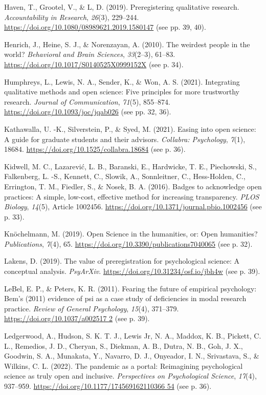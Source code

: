\documentclass[authordate, empirical,issue]{jote-new-article}
\begin{document}
Haven, T., Grootel, V., \& L, D. (2019). Preregistering qualitative research. \emph{Accountability in Research}, \emph{26}(3), 229–244. \url{https://doi.org/10.1080/08989621.2019.1580147} (see pp. 39, 40).

Henrich, J., Heine, S. J., \& Norenzayan, A. (2010). The weirdest people in the world? \emph{Behavioral and Brain Sciences}, \emph{33}(2–3), 61–83. \url{https://doi.org/10.1017/S0140525X0999152X} (see p. 34).

Humphreys, L., Lewis, N. A., Sender, K., \& Won, A. S. (2021). Integrating qualitative methods and open science: Five principles for more trustworthy research. \emph{Journal of Communication}, \emph{71}(5), 855–874. \url{https://doi.org/10.1093/joc/jqab026} (see pp. 32, 36).

Kathawalla, U. -K., Silverstein, P., \& Syed, M. (2021). Easing into open science: A guide for graduate students and their advisors. \emph{Collabra: Psychology}, \emph{7}(1), 18684. \url{https://doi.org/10.1525/collabra.18684} (see p. 36).

Kidwell, M. C., Lazarević, L. B., Baranski, E., Hardwicke, T. E., Piechowski, S., Falkenberg, L. -S., Kennett, C., Slowik, A., Sonnleitner, C., Hess-Holden, C., Errington, T. M., Fiedler, S., \& Nosek, B. A. (2016). Badges to acknowledge open practices: A simple, low-cost, effective method for increasing transparency. \emph{PLOS Biology}, \emph{14}(5), Article 1002456. \url{https://doi.org/10.1371/journal.pbio.1002456} (see p. 33).

Knöchelmann, M. (2019). Open Science in the humanities, or: Open humanities? \emph{Publications}, \emph{7}(4), 65. \url{https://doi.org/10.3390/publications7040065} (see p. 32).

Lakens, D. (2019). The value of preregistration for psychological science: A conceptual analysis. \emph{PsyArXiv}. \url{https://doi.org/10.31234/osf.io/jbh4w} (see p. 39).

LeBel, E. P., \& Peters, K. R. (2011). Fearing the future of empirical psychology: Bem’s (2011) evidence of psi as a case study of deficiencies in modal research practice. \emph{Review of General Psychology}, \emph{15}(4), 371–379. \url{https://doi.org/10.1037/a002517
  2} (see p. 39).

Ledgerwood, A., Hudson, S. K. T. J., Lewis Jr, N. A., Maddox, K. B., Pickett, C. L., Remedios, J. D., Cheryan, S., Diekman, A. B., Dutra, N. B., Goh, J. X., Goodwin, S. A., Munakata, Y., Navarro, D. J., Onyeador, I. N., Srivastava, S., \& Wilkins, C. L. (2022). The pandemic as a portal: Reimagining psychological science as truly open and inclusive. \emph{Perspectives on Psychological Science}, \emph{17}(4), 937–959. \url{https://doi.org/10.1177/174569162110366 54} (see p. 36).
\end{document}
